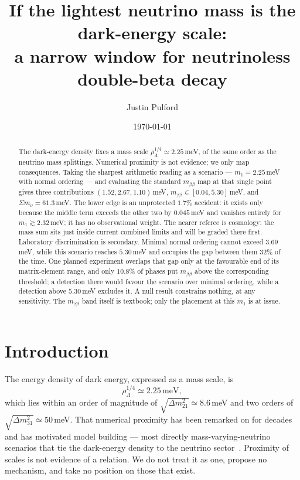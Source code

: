 \documentclass[aps,prd,twocolumn,superscriptaddress,nofootinbib,10pt]{revtex4-2}
\begin{document}
\title{If the lightest neutrino mass is the dark-energy scale:\\
a narrow window for neutrinoless double-beta decay}

\author{Justin Pulford}

\date{\today}

\begin{abstract}
The dark-energy density fixes a mass scale $\rho_\Lambda^{1/4} \simeq 2.25\,$meV, of the same
order as the neutrino mass splittings. Numerical proximity is not evidence; we only map
consequences. Taking the sharpest arithmetic reading as a scenario --- $m_1 = 2.25\,$meV with
normal ordering --- and evaluating the standard $m_{\beta\beta}$ map at that single point gives
three contributions $(1.52, 2.67, 1.10)\,$meV, $m_{\beta\beta} \in [0.04, 5.30]\,$meV, and
$\Sigma m_\nu = 61.3\,$meV. The lower edge is an unprotected $1.7\%$ accident: it exists only
because the middle term exceeds the other two by $0.045\,$meV and vanishes entirely for
$m_1 \gtrsim 2.32\,$meV; it has no observational weight. The nearer referee is cosmology: the mass
sum sits just inside current combined limits and will be graded there first. Laboratory
discrimination is secondary. Minimal normal ordering cannot exceed $3.69\,$meV, while this
scenario reaches $5.30\,$meV and occupies the gap between them $32\%$ of the time. One planned
experiment overlaps that gap only at the favourable end of its matrix-element range, and only
$10.8\%$ of phases put $m_{\beta\beta}$ above the corresponding threshold; a detection there would
favour the scenario over minimal ordering, while a detection above $5.30\,$meV excludes it. A null
result constrains nothing, at any sensitivity. The $m_{\beta\beta}$ band itself is textbook; only
the placement at this $m_1$ is at issue.
\end{abstract}

\maketitle

\section{Introduction}\label{sec:intro}

The energy density of dark energy, expressed as a mass scale, is
%
\begin{equation}
  \rho_\Lambda^{1/4} \simeq 2.25\,\mathrm{meV},
  \label{eq:rho}
\end{equation}
%
which lies within an order of magnitude of $\sqrt{\Delta m^2_{21}} \simeq 8.6\,$meV and two orders
of $\sqrt{\Delta m^2_{31}} \simeq 50\,$meV. That numerical proximity has been remarked on for
decades and has motivated model building --- most directly mass-varying-neutrino scenarios that
tie the dark-energy density to the neutrino sector~\cite{FardonNelsonWeiner2004,PecceiMaVaN2005}.
Proximity of scales is not evidence of a relation. We do not treat it as one, propose no mechanism,
and take no position on those that exist.
\end{document}
